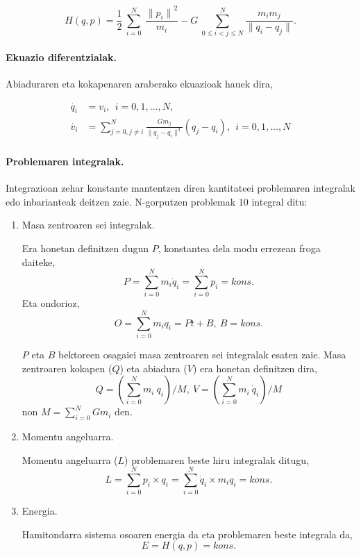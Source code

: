 \begin{equation}
H(q,p)=\frac{1}{2}\ \sum^N_{i=0}{\ \frac{{\|p_i\|}^2}{m_i}}-G\ \sum^N_{0\le i<j\le N}{\frac{m_im_j}{\|q_i-q_j\|}}. 
\end{equation}

\paragraph*{Ekuazio diferentzialak.} Abiaduraren eta kokapenaren araberako ekuazioak hauek dira,

\begin{align}
\dot{q_i} &=v_i, \ \  i=0,1,\dots, N,\\
\dot{v_i} &= \sum_{j=0,j \neq i}^{N} \frac{Gm_j}{\|q_j-q_i\|^3} (q_j-q_i) , \ \  i=0,1,\dots, N
\end{align}



\paragraph*{Problemaren integralak.}
Integrazioan zehar konstante mantentzen diren kantitateei problemaren integralak edo inbarianteak deitzen zaie. N-gorputzen problemak $10$ integral ditu:
\begin{enumerate}


\item Masa zentroaren sei integralak.

Era honetan definitzen dugun $P$, konstantea dela modu errezean froga daiteke, 
\begin{equation*}
P=\sum_{i=0}^{N} m_i \dot{q}_i=\sum_{i=0}^{N} p_i=kons. 
\end{equation*}
Eta ondorioz,
\begin{equation*}
O=\sum_{i=0}^{N} m_i {q}_i=Pt+B, \ B=kons. 
\end{equation*}

$P$ eta $B$ bektoreen osagaiei masa zentroaren sei integralak esaten zaie. Masa zentroaren kokapen ($Q$) eta abiadura ($V$)  era honetan definitzen dira, 
\begin{equation*}
Q={\left(\sum\limits_{i=0}^{N} m_i \ q_i\right)}/{M}, \ V={\left(\sum\limits_{i=0}^{N} m_i \ \dot{q}_i\right)}/{M}
\end{equation*}
non $M=\sum\limits_{i=0}^{N}Gm_i$ den.


\item Momentu angeluarra.

Momentu angeluarra ($L$) problemaren beste hiru integralak ditugu, 
\begin{equation*}
L=\sum_{i=0}^{N} p_i \times q_i=\sum_{i=0}^{N} \dot{q}_i \times m_i q_i=kons.
\end{equation*}

\item Energia.

Hamitondarra sistema osoaren energia da eta problemaren beste integrala da,
\begin{equation*}
E=H(q,p)=kons.
\end{equation*}

\end{enumerate}

